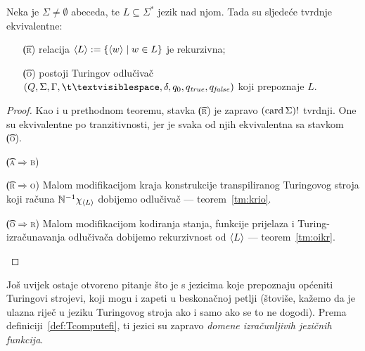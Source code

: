\begin{teorem}
Neka je $\Sigma\not=\emptyset$ abeceda, te $L\subseteq\Sigma^*$ jezik nad njom. Tada su sljedeće tvrdnje ekvivalentne:
\begin{itemize}
    \item[\t{(\textsc r)}] relacija $\langle L\rangle:=\{\langle w\rangle\mid w\in L\}$ je rekurzivna;
    \item[\t{(\textsc o)}] postoji Turingov odlučivač $(Q,\Sigma,\Gamma,\bl,\delta,q_0,q_\mathit{true},q_\mathit{false})$ koji prepoznaje $L$.
\end{itemize}
\end{teorem}
\begin{proof}
Kao i u prethodnom teoremu, stavka \t{(\textsc r)} je zapravo $(\operatorname{card}\Sigma)!$ tvrdnji. One su ekvivalentne po tranzitivnosti, jer je svaka od njih ekvivalentna sa stavkom \t{(\textsc o)}.
\begin{labeling}{\t{(\textsc a$\Rightarrow$\textsc b)}}
\item[\t{(\textsc r$\Rightarrow$\textsc o)}] Malom modifikacijom kraja konstrukcije transpiliranog Turingovog stro\-ja koji računa ${\mathbb N}^{-1}\chi_{\langle L\rangle}$ dobijemo odlučivač --- teorem~\ref{tm:krio}.
\item[\t{(\textsc o$\Rightarrow$\textsc r)}] Malom modifikacijom kodiranja stanja, funkcije prijelaza i Turing-iz\-ra\-ču\-na\-va\-nja odlučivača dobijemo rekurzivnost od $\langle L\rangle$ --- teorem~\ref{tm:oikr}.\qedhere
\end{labeling}
\end{proof}

Još uvijek ostaje otvoreno pitanje što je s jezicima koje prepoznaju općeniti Turingovi strojevi, koji mogu i zapeti u beskonačnoj petlji (štoviše, kažemo da je ulazna riječ u jeziku Turingovog stroja ako i samo ako se to ne dogodi). Prema definiciji~\ref{def:Tcomputefi}, ti jezici su zapravo \emph{domene izračunljivih jezičnih funkcija}.

